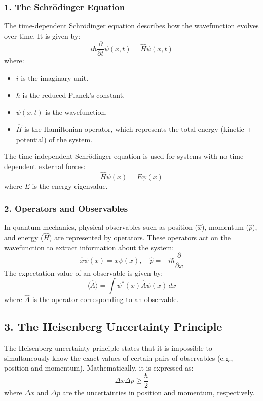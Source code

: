 \subsubsection{1. The Schrödinger Equation}
The time-dependent Schrödinger equation describes how the wavefunction evolves over time. It is given by:
\[
i\hbar \frac{\partial}{\partial t} \psi(x,t) = \hat{H} \psi(x,t)
\]
where:
\begin{itemize}
    \item $i$ is the imaginary unit.
    \item $\hbar$ is the reduced Planck's constant.
    \item $\psi(x,t)$ is the wavefunction.
    \item $\hat{H}$ is the Hamiltonian operator, which represents the total energy (kinetic + potential) of the system.
\end{itemize}

The time-independent Schrödinger equation is used for systems with no time-dependent external forces:
\[
\hat{H} \psi(x) = E \psi(x)
\]
where $E$ is the energy eigenvalue.

\subsubsection{2. Operators and Observables}
In quantum mechanics, physical observables such as position ($\hat{x}$), momentum ($\hat{p}$), and energy ($\hat{H}$) are represented by operators. These operators act on the wavefunction to extract information about the system:
\[
\hat{x} \psi(x) = x \psi(x), \quad \hat{p} = -i\hbar \frac{\partial}{\partial x}
\]
The expectation value of an observable is given by:
\[
\langle \hat{A} \rangle = \int \psi^*(x) \hat{A} \psi(x) \, dx
\]
where $\hat{A}$ is the operator corresponding to an observable.

\subsection*{3. The Heisenberg Uncertainty Principle}
The Heisenberg uncertainty principle states that it is impossible to simultaneously know the exact values of certain pairs of observables (e.g., position and momentum). Mathematically, it is expressed as:
\[
\Delta x \Delta p \geq \frac{\hbar}{2}
\]
where $\Delta x$ and $\Delta p$ are the uncertainties in position and momentum, respectively.


